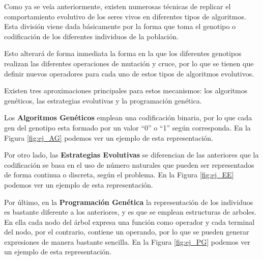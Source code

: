 Como ya se veía anteriormente, existen numerosas técnicas de replicar el comportamiento evolutivo de los seres vivos en diferentes tipos de algoritmos. Esta división viene dada básicamente por la forma que toma el genotipo o codificación de los diferentes individuos de la población.

Esto alterará de forma inmediata la forma en la que los diferentes genotipos realizan las diferentes operaciones de mutación y cruce, por lo que se tienen que definir nuevos operadores para cada uno de estos tipos de algoritmos evolutivos.

Existen tres aproximaciones principales para estos mecanismos: los algoritmos genéticos, las estrategias evolutivas y la programación genética.

Los \textbf{Algoritmos Genéticos} \cite{Holland1984} emplean una codificación binaria, por lo que cada gen del genotipo esta formado por un valor ``0'' o ``1'' según corresponda. En la Figura \ref{fig:ej_AG} podemos ver un ejemplo de esta representación.

Por otro lado, las \textbf{Estrategias Evolutivas} \cite{Beyer2002} se diferencian de las anteriores que la codificación se basa en el uso de número naturales que pueden ser representados de forma continua o discreta, según el problema. En la Figura \ref{fig:ej_EE} podemos ver un ejemplo de esta representación.

Por último, en la \textbf{Programación Genética} \cite{koza1992genetic} la representación de los individuos es bastante diferente a los anteriores, y es que se emplean estructuras de arboles. En ella cada nodo del árbol expresa una función como operador y cada terminal del nodo, por el contrario, contiene un operando, por lo que se pueden generar expresiones de manera bastante sencilla. En la Figura \ref{fig:ej_PG} podemos ver un ejemplo de esta representación.

